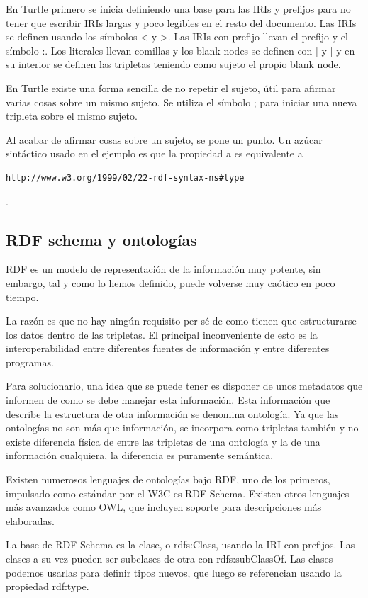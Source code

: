 \documentclass[12pt]{report} %
\begin{document}
En Turtle primero se inicia definiendo una base para las IRIs y prefijos para no tener que escribir IRIs largas y poco legibles en el resto del documento.
Las IRIs se definen usando los símbolos < y >. Las IRIs con prefijo llevan el prefijo y el símbolo :. 
Los literales llevan comillas y los blank nodes se definen con [ y ] y en su interior se definen las tripletas teniendo como sujeto el propio blank node.

En Turtle existe una forma sencilla de no repetir el sujeto, útil para afirmar varias cosas sobre un mismo sujeto. Se utiliza el símbolo ; para iniciar una nueva tripleta sobre el mismo sujeto.

Al acabar de afirmar cosas sobre un sujeto, se pone un punto. Un azúcar sintáctico usado en el ejemplo es que la propiedad a es equivalente a \begin{verbatim}http://www.w3.org/1999/02/22-rdf-syntax-ns#type\end{verbatim}.

\subsection{RDF schema y ontologías}

RDF es un modelo de representación de la información muy potente, sin embargo, tal y como lo hemos definido, puede volverse muy caótico en poco tiempo.

La razón es que no hay ningún requisito per sé de como tienen que estructurarse los datos dentro de las tripletas. El principal inconveniente de esto es la interoperabilidad entre diferentes fuentes de información y entre diferentes programas.

Para solucionarlo, una idea que se puede tener es disponer de unos metadatos que informen de como se debe manejar esta información. Esta información que describe la estructura de otra información se denomina ontología. Ya que las ontologías no son más que información, se incorpora como tripletas también y no existe diferencia física de entre las tripletas de una ontología y la de una información cualquiera, la diferencia es puramente semántica. 

Existen numerosos lenguajes de ontologías bajo RDF, uno de los primeros, impulsado como estándar por el W3C es RDF Schema. Existen otros lenguajes más avanzados como OWL, que incluyen soporte para descripciones más elaboradas.

La base de RDF Schema es la clase, o rdfs:Class, usando la IRI con prefijos. Las clases a su vez pueden ser subclases de otra con rdfs:subClassOf. Las clases podemos usarlas para definir tipos nuevos, que luego se referencian usando la propiedad rdf:type.
\end{document}
